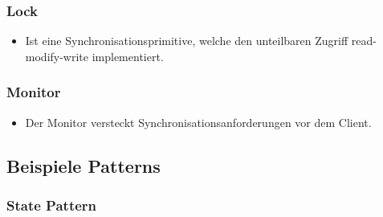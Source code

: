 \subsubsection{Lock}
  \begin{itemize}
  \item Ist eine Synchronisationsprimitive, welche den unteilbaren Zugriff read-modify-write
  implementiert.
  \end{itemize}
\subsubsection{Monitor}
  \begin{itemize}
  \item Der Monitor versteckt Synchronisationsanforderungen vor dem Client.
  \end{itemize}

\subsection{Beispiele Patterns}
\subsubsection{State Pattern}
